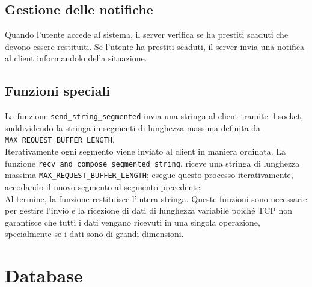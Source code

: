 \documentclass[]{report}
\begin{document}
\section{Gestione delle notifiche}
Quando l'utente accede al sistema, il server verifica se ha prestiti scaduti che devono essere restituiti. Se l'utente ha prestiti scaduti, il server invia una notifica al client informandolo della situazione.

\section{Funzioni speciali}
La funzione \texttt{send\_string\_segmented} invia una stringa al client tramite il socket, suddividendo la stringa in segmenti di lunghezza massima definita da \texttt{MAX\_REQUEST\_BUFFER\_LENGTH}.\\
Iterativamente ogni segmento viene inviato al client in maniera ordinata. \meskip
La funzione \texttt{recv\_and\_compose\_segmented\_string}, riceve una stringa di lunghezza \\ massima \texttt{MAX\_REQUEST\_BUFFER\_LENGTH}; esegue questo processo iterativamente, accodando il nuovo segmento al segmento precedente.\\
Al termine, la funzione restituisce l'intera stringa.\bskip
Queste funzioni sono necessarie per gestire l'invio e la ricezione di dati di lunghezza variabile poiché TCP non garantisce che tutti i dati vengano ricevuti in una singola operazione, specialmente se i dati sono di grandi dimensioni.

\chapter{Database}
\end{document}
